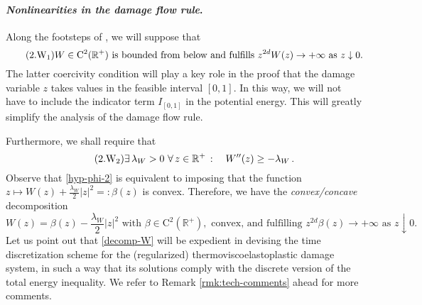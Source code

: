 \documentclass[a4paper,10pt,reqno]{amsart}
\numberwithin{equation}{section}
\newcommand{\R}{\mathbb{R}}
\numberwithin{equation}{section}
\newcommand{\down}{\downarrow}
\newcommand{\condu}{\kappa}
\newcommand{\EEE}{\color{black}}
\begin{document}
\paragraph{{\em Nonlinearities in  the damage flow rule}.}
Along the footsteps of   \cite{Crismale-Lazzaroni}, we will suppose that 
\begin{equation}
\label{hyp-phi-1}
\tag{2.$\mathrm{W}_1$} 
W  \in \mathrm{C}^2 (\R^+)  \text{ is bounded from below and fulfills } z^{2d} W(z) \to +\infty \text{ as } z \down 0.
\end{equation}
The latter coercivity condition will play a key role in the proof  that the damage variable  $z$ takes values in the feasible interval $[0,1]$. In this way, we will not have to include the  indicator term  $I_{[0,1]}$ in the potential energy. %
 This will greatly simplify the analysis of the damage flow rule.
\par
Furthermore, 
we shall require that 
\begin{equation}
\label{hyp-phi-2}
\tag{2.$\mathrm{W}_2$}
\exists\, \lambda_W>0 \ \forall\, z \in \R^+ \, : \quad W''(z) \geq -\lambda_W\,.
\end{equation}
Observe that  \eqref{hyp-phi-2} is equivalent to imposing that the function $z\mapsto W(z) + \tfrac{\lambda_W}2|z|^2 =: {\beta}(z)$  is convex. Therefore, 
we have the \emph{convex/concave} decomposition
\begin{equation}
\label{decomp-W}
W(z) = {\beta}(z) - \frac{\lambda_W}2|z|^2  \text{ with } \beta  \in \mathrm{C}^2 (\R^+), \text{ convex, and fulfilling  }  z^{2d} \beta(z) \to +\infty \text{ as } z \down 0.
\end{equation}
Let us point out that  \eqref{decomp-W}  will be expedient in devising the time discretization scheme for the (regularized) thermoviscoelastoplastic
damage system, in such a way that its solutions comply with the discrete version of the total energy inequality. We refer to Remark \ref{rmk:tech-comments} ahead for more comments.
\end{document}
